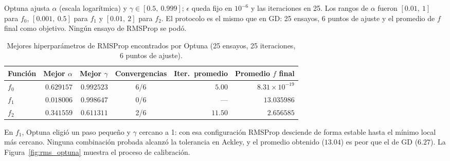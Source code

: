 Optuna ajusta $\alpha$ (escala logarítmica) y $\gamma\in[0.5,\ 0.999]$;
$\epsilon$ queda fijo en $10^{-6}$ y las iteraciones en 25. Los rangos de
$\alpha$ fueron $[0.01,\ 1]$ para $f_0$, $[0.001,\ 0.5]$ para $f_1$ y
$[0.01,\ 2]$ para $f_2$. El protocolo es el mismo que en GD: 25 ensayos,
6 puntos de ajuste y el promedio de $f$ final como objetivo. Ningún ensayo
de RMSProp se podó.

\begin{table}[H]
\centering
\begin{tabular}{lrrcrr}
\toprule
Función & Mejor $\alpha$ & Mejor $\gamma$ & Convergencias & Iter.\ promedio & Promedio $f$ final \\
\midrule
$f_0$ & $0.629157$ & $0.992523$ & 6/6 & $5.00$  & $8.31\times10^{-19}$ \\
$f_1$ & $0.018006$ & $0.998647$ & 0/6 & ---     & $13.035986$ \\
$f_2$ & $0.341559$ & $0.611311$ & 2/6 & $11.50$ & $2.656585$ \\
\bottomrule
\end{tabular}
\caption{Mejores hiperparámetros de RMSProp encontrados por Optuna (25
ensayos, 25 iteraciones, 6 puntos de ajuste).}
\label{tab:rms_optuna}
\end{table}

En $f_1$, Optuna eligió un paso pequeño y $\gamma$ cercano a 1: con esa
configuración RMSProp desciende de forma estable hasta el mínimo local más
cercano. Ninguna combinación probada alcanzó la tolerancia en Ackley, y el
promedio obtenido ($13.04$) es peor que el de GD ($6.27$). La
Figura~\ref{fig:rms_optuna} muestra el proceso de calibración.

